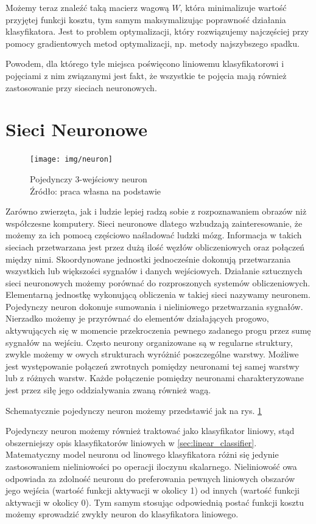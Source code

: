 Możemy teraz znaleźć taką macierz wagową $W$, która minimalizuje wartość przyjętej funkcji kosztu, tym samym maksymalizując poprawność działania klasyfikatora.
Jest to problem optymalizacji, który rozwiązujemy najczęściej przy pomocy gradientowych metod optymalizacji, np. metody najszybszego spadku. \cite{cs231n}

Powodem, dla którego tyle miejsca poświęcono liniowemu klasyfikatorowi i pojęciami z nim związanymi jest fakt, że wszystkie te pojęcia mają również zastosowanie przy sieciach neuronowych.

\section{Sieci Neuronowe}\label{sec:nn}

\begin{figure}[h!tb]
	 \centering
	 \texttt{[image: img/neuron]}
	 \caption{Pojedynczy 3-wejściowy neuron \\
              Źródło: praca własna na podstawie \cite{cs231n,zuradabarskijedruch1996}}
	 \label{fig:neuron}
\end{figure}

Zarówno zwierzęta, jak i ludzie lepiej radzą sobie z rozpoznawaniem obrazów niż współczesne komputery.
Sieci neuronowe dlatego wzbudzają zainteresowanie, że możemy za ich pomocą częściowo naśladować ludzki mózg.
Informacja w takich sieciach przetwarzana jest przez dużą ilość węzłów obliczeniowych oraz połączeń między nimi.
Skoordynowane jednostki jednocześnie dokonują przetwarzania wszystkich lub większości sygnałów i danych wejściowych.
Działanie sztucznych sieci neuronowych możemy porównać do rozproszonych systemów obliczeniowych.
Elementarną jednostkę wykonującą obliczenia w takiej sieci nazywamy neuronem.
Pojedynczy neuron dokonuje sumowania i nieliniowego przetwarzania sygnałów.
Nierzadko możemy je przyrównać do elementów działających progowo, aktywujących się w momencie przekroczenia pewnego zadanego progu przez sumę sygnałów na wejściu.
Często neurony organizowane są w regularne struktury, zwykle możemy w owych strukturach wyróżnić poszczególne warstwy.
Możliwe jest występowanie połączeń zwrotnych pomiędzy neuronami tej samej warstwy lub z różnych warstw.
Każde połączenie pomiędzy neuronami charakteryzowane jest przez siłę jego oddziaływania zwaną również wagą. \cite{zuradabarskijedruch1996}

Schematycznie pojedynczy neuron możemy przedstawić jak na rys. \ref{fig:neuron}

Pojedynczy neuron możemy również traktować jako klasyfikator liniowy, stąd obszerniejszy opis klasyfikatorów liniowych w \ref{sec:linear_classifier}.
Matematyczny model neuronu od linowego klasyfikatora różni się jedynie zastosowaniem nieliniowości po operacji iloczynu skalarnego.
Nieliniowość owa odpowiada za zdolność neuronu do preferowania pewnych liniowych obszarów jego wejścia (wartość funkcji aktywacji w okolicy 1) od innych (wartość funkcji aktywacji w okolicy 0).
Tym samym stosując odpowiednią postać funkcji kosztu możemy sprowadzić zwykły neuron do klasyfikatora liniowego. \cite{cs231n}

